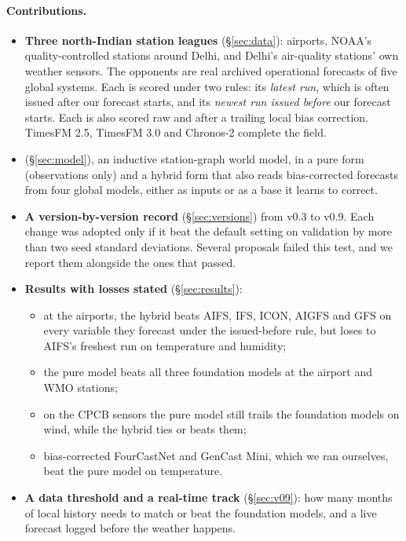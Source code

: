 \paragraph{Contributions.}
\begin{itemize}
\item \textbf{Three north-Indian station leagues} (\S\ref{sec:data}): airports, NOAA's quality-controlled stations
around Delhi, and Delhi's air-quality stations' own weather sensors. The opponents are real archived operational
forecasts of five global systems. Each is scored under two rules: its \emph{latest run}, which is often issued
after our forecast starts, and its \emph{newest run issued before} our forecast starts. Each is also scored raw and
after a trailing local bias correction. TimesFM 2.5, TimesFM 3.0 and Chronos-2 complete the field.
\item \textbf{\pwm} (\S\ref{sec:model}), an inductive station-graph world model, in a pure form (observations only)
and a hybrid form that also reads bias-corrected forecasts from four global models, either as inputs or as a base
it learns to correct.
\item \textbf{A version-by-version record} (\S\ref{sec:versions}) from v0.3 to v0.9. Each change was adopted only if
it beat the default setting on validation by more than two seed standard deviations. Several proposals failed
this test, and we report them alongside the ones that passed.
\item \textbf{Results with losses stated} (\S\ref{sec:results}):
\begin{itemize}
\item at the airports, the hybrid beats AIFS, IFS, ICON, AIGFS and GFS on every variable they forecast under the issued-before
rule, but loses to AIFS's freshest run on temperature and humidity;
\item the pure model beats all three foundation models at the airport and WMO stations;
\item on the CPCB sensors the pure model still trails the foundation models on wind, while the hybrid ties or
beats them;
\item bias-corrected FourCastNet and GenCast Mini, which we ran ourselves, beat the pure model on temperature.
\end{itemize}
\item \textbf{A data threshold and a real-time track} (\S\ref{sec:v09}): how many months of local history \pwm needs
to match or beat the foundation models, and a live forecast logged before the weather happens.
\end{itemize}
